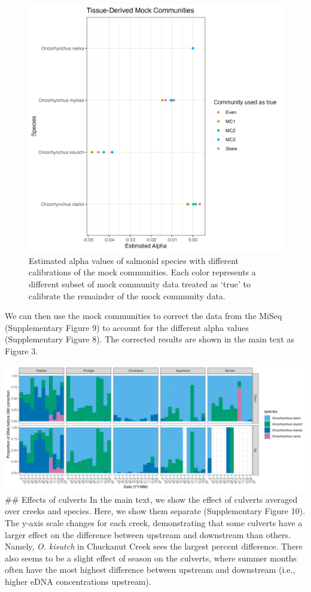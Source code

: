 \documentclass[
]{article}
\begin{document}
\begin{figure}
\centering
\includegraphics{../Output/SupplementalFigures/mock_internal_calibration_compare_alphas.png}
\caption{Estimated alpha values of salmonid species with different
calibrations of the mock communities. Each color represents a different
subset of mock community data treated as `true' to calibrate the
remainder of the mock community data.}
\end{figure}

We can then use the mock communities to correct the data from the MiSeq
(Supplementary Figure 9) to account for the different alpha values
(Supplementary Figure 8). The corrected results are shown in the main
text as Figure 3.

\includegraphics{../Output/SupplementalFigures/20221123_proportions_before_qm.png}
\#\# Effects of culverts In the main text, we show the effect of
culverts averaged over creeks and species. Here, we show them separate
(Supplementary Figure 10). The y-axis scale changes for each creek,
demonstrating that some culverts have a larger effect on the difference
between upstream and downstream than others. Namely, \emph{O. kisutch}
in Chuckanut Creek sees the largest percent difference. There also seems
to be a slight effect of season on the culverts, where summer months
often have the most highest difference between upstream and downstream
(i.e., higher eDNA concentrations upstream).
\end{document}

